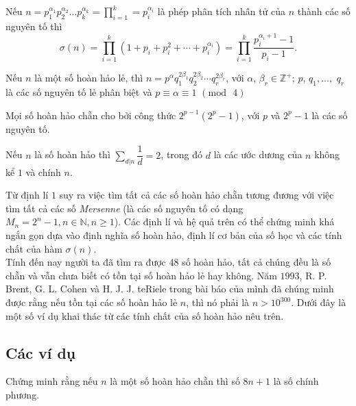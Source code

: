 \begin{dl}
	Nếu $n=p_1^{\alpha _1}p_2^{\alpha _2}\ldots p_k^{\alpha _k}=\displaystyle\prod\limits_{i=1}^k=p_i^{\alpha_i}$ là phép phân tích nhân tử của $n$ thành các số nguyên tố thì 
	$$\sigma (n)=\displaystyle\prod\limits_{i=1}^k(1+p_i+p_i^2+\cdots+p_i^{\alpha_i})=\displaystyle\prod\limits_{i=1}^k \dfrac{p_i^{\alpha_i+1}-1}{p_i-1}.$$
\end{dl}

\begin{dl}
	Nếu $n$ là một số hoàn hảo lẻ, thì $n=p^{\alpha}q_1^{2\beta_1}q_2^{2\beta_2}\cdots q_r^{2\beta_r}$, với $\alpha$, $\beta_r\in \mathbb{Z}^+$; $p$, $q_1,\ldots,$ $q_r$ là các số nguyên tố lẻ phân biệt và $p\equiv \alpha\equiv 1$ $\left(\mathrm{mod} \text{ }4\right)$
\end{dl}

\begin{hq}
	Mọi số hoàn hảo chẵn cho bởi công thức $2^{p-1}(2^p-1)$, với $p$ và $2^p-1$ là các số nguyên tố.
\end{hq}

\begin{hq}
	Nếu $n$ là số hoàn hảo thì $\displaystyle\sum\limits_{d|n}\dfrac{1}{d}=2$, trong đó $d$ là các ước dương của $n$ không kể $1$ và chính $n$.
\end{hq}
Từ định lí $1$ suy ra việc tìm tất cả các số hoàn hảo chẵn tương đương với việc tìm tất cả các số \textit{Mersenne} (là các số nguyên tố có dạng $M_n=2^n-1, n\in \mathbb{N}, n\ge 1$). Các định lí và hệ quả trên có thể chứng minh khá ngắn gọn dựa vào định nghĩa số hoàn hảo, định lí cơ bản của số học và các tính chất của hàm $\sigma (n)$.\\
Tính đến nay người ta đã tìm ra được $48$ số hoàn hảo, tất cả chúng đều là số chẵn và vẫn chưa biết có tồn tại số hoàn hảo lẻ hay không. Năm $1993$, R. P. Brent, G. L. Cohen và H. J. J. teRiele trong bài báo của mình đã chúng minh được rằng nếu tồn tại các số hoàn hảo lẻ $n$, thì nó phải là $n>10^{300}$. Dưới đây là một số ví dụ khai thác từ các tính chất của số hoàn hảo nêu trên. 

\subsection{Các ví dụ}

\begin{vd}
	Chứng minh rằng nếu $n$ là một số hoàn hảo chẵn thì số $8n+1$ là số chính phương.
\end{vd}

